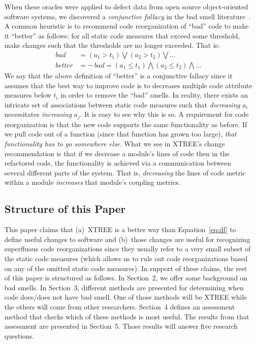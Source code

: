 \documentclass[twocolumn,5p]{elsarticle}
\newcommand{\eq}[1]{Equation~\ref{eq:#1}}
\theoremstyle{break}
\begin{document}
	When these oracles were applied to defect data from
	open source object-oriented software systems, we discovered a {\em conjunctive fallacy}
	in the bad smell literature~\cite{erni96,bender99,Shatnawi10,Alves2010,hermans15}.
	A common heuristic is to recommend code reorganization of ``bad'' code
	to make it ``better'' as follows: for all static code measures that exceed some threshold, make changes such that the thresholds are no longer exceeded. That is:
	\begin{equation}\label{eq:df}
		\scriptstyle
		\begin{array}{rl}
			\mathit{bad}    & = \left(a_1 > t_1 \right) \bigvee \left(a_2 > t_2\right) \bigvee    ...                             \\
			\mathit{better} & = \neg\;\mathit{bad} = \left(a_1 \le t_1 \right) \bigwedge \left(a_2 \le t_2\right)  \bigwedge  ... 
		\end{array}
	\end{equation}
	We say that the above definition of ``better'' is a conjunctive fallacy
	since it assumes that the best way to improve code is to decreases multiple code attribute measures below $t_i$ in order
	to remove the ``bad'' smells. In reality, there exists an intricate set of associations between static code measures
	such that {\em decreasing}  $a_i$ necessitates {\em increasing} $a_j$.
	It is easy to see why this is so.
	A requirement for  code reorganization is that the new code supports the same functionality
	as before. If we pull code out of a function (since that function has grown too
	large), {\em that functionality has to go somewhere else}. What we see in XTREE's change
	recommendation is that if we decrease a module's lines of code  then in the refactored
	code, the functionality is achieved via a communication between several different parts
	of the system. That is, {\em decreasing} the lines of code metric within a module {\em increases}
	that module's coupling metrics.
	
	\subsection{Structure of this Paper}
	
	This paper  claims that (a)~XTREE is a  better way than \eq{df}  to define useful changes to software and (b)~those changes are useful for recognizing   superfluous code reorganizations since they usually refer to a very 
	small subset of the static code measures (which allows us to rule out code reorganizations based on any of the omitted
	static code measures). 
	In support of these claims, 
	the rest of this paper is structured as follows. In Section~2, we offer some background on bad smells. In Section~3, 
	different methods are presented for determining when code does/does not have bad smell. One of those methods
	will be XTREE while the others will come from other researchers. Section~4
	defines an assessment method that checks which of these methods is most useful. The results from that assessment 
	are presented in Section~5. Those results will answer five research questions.
	
\end{document}
